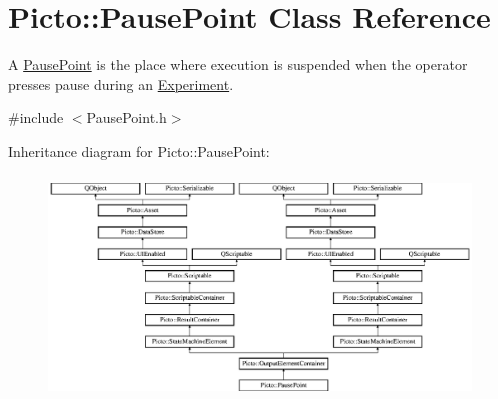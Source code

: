 \hypertarget{class_picto_1_1_pause_point}{\section{Picto\-:\-:Pause\-Point Class Reference}
\label{class_picto_1_1_pause_point}
}


A \hyperlink{class_picto_1_1_pause_point}{Pause\-Point} is the place where execution is suspended when the operator presses pause during an \hyperlink{class_picto_1_1_experiment}{Experiment}.  




{\ttfamily \#include $<$Pause\-Point.\-h$>$}

Inheritance diagram for Picto\-:\-:Pause\-Point\-:\begin{figure}[H]
\begin{center}
\leavevmode
\includegraphics[height=5.894737cm]{class_picto_1_1_pause_point}
\end{center}
\end{figure}
